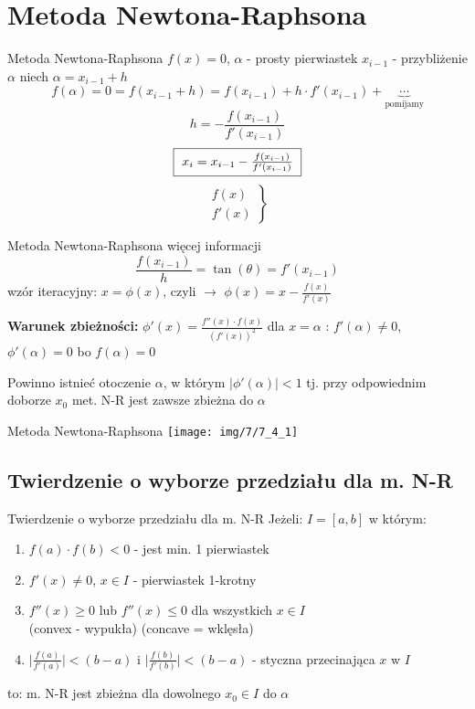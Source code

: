 \section{Metoda Newtona-Raphsona}
\begin{frame}{Metoda Newtona-Raphsona}
	$f(x) = 0$, $\alpha$ - prosty pierwiastek\linebreak
	$x_{i-1}$ - przybliżenie $\alpha$\linebreak
	niech $\alpha = x_{i-1} + h$
	\[
		f(\alpha) = 0 = f(x_{i-1} + h) = f(x_{i-1}) + h \cdot f'(x_{i-1}) + \underbrace{\cdots}_{\text{pomijamy}}
	\]
	\[
		h = - \frac{f(x_{i-1})}{f'(x_{i-1})}
	\]
	\[
		\fbox{ $x_{i} = x_{i-1} - \frac{f(x_{i-1})}{f'(x_{i-1})}$ }
	\]
	\[
		\left. \begin{array}{ll}
			f(x)\\
			f'(x)
		\end{array}\right\}
	\]
\end{frame}
\begin{frame}{Metoda Newtona-Raphsona}
	więcej informacji
	\[
		\frac{f(x_{i-1})}{h} = \tan(\theta) = f'(x_{i-1})
	\]
	wzór iteracyjny:
	$x = \phi(x)$, czyli $\rightarrow$ $\phi(x) = x - \frac{f(x)}{f'(x)}$\linebreak
	
	\textbf{Warunek zbieżności: } $\phi'(x) = \frac{f''(x) \cdot f(x)}{(f'(x))^{2}}$ dla $x = \alpha$ : $f'(\alpha) \neq 0$, $\phi'(\alpha) = 0$ bo $f(\alpha) = 0$\linebreak
	
	Powinno istnieć otoczenie $\alpha$, w którym $\lvert \phi'(\alpha) \rvert < 1$ tj. przy odpowiednim doborze $x_{0}$ met. N-R jest zawsze zbieżna do $\alpha$
\end{frame}
\begin{frame}{Metoda Newtona-Raphsona}
	\centering
	\texttt{[image: img/7/7\_4\_1]}
\end{frame}
\subsection{Twierdzenie o wyborze przedziału dla m. N-R}
\begin{frame}{Twierdzenie o wyborze przedziału dla m. N-R}
	Jeżeli: $I = \left[a, b\right]$ w którym:
	\begin{enumerate}
		\item $f(a) \cdot f(b) < 0$ - jest min. 1 pierwiastek
		\item $f'(x) \neq 0$, $x \in I$ - pierwiastek 1-krotny
		\item $f''(x) \geq 0$ lub $f''(x) \leq 0$ dla wszystkich $x \in I$\\
			(convex - wypukła) (concave = wklęsła)
		\item $\lvert \frac{f(a)}{f'(a)} \rvert < (b - a)$ i $\lvert \frac{f(b)}{f'(b)} \rvert < (b - a)$ - styczna przecinająca $x$ w $I$
	\end{enumerate}
	to:
	m. N-R jest zbieżna dla dowolnego $x_{0} \in I$ do $\alpha$
\end{frame}
